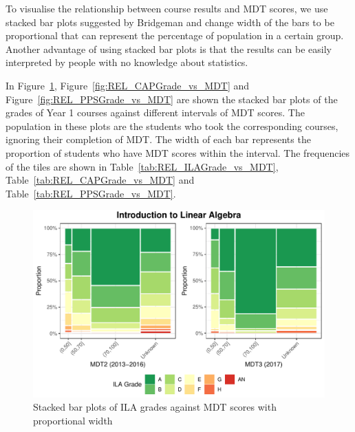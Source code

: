 \documentclass[a4paper]{report}
\begin{document}
To visualise the relationship between course results and MDT scores, we use stacked bar plots suggested by Bridgeman \cite{stackbar} and change width of the bars to be proportional that can represent the percentage of population in a certain group. Another advantage of using stacked bar plots is that the results can be easily interpreted by people with no knowledge about statistics. 

In Figure~\ref{fig:REL_ILAGrade_vs_MDT}, Figure~\ref{fig:REL_CAPGrade_vs_MDT} and Figure~\ref{fig:REL_PPSGrade_vs_MDT} are shown the stacked bar plots of the grades of Year 1 courses against different intervals of MDT scores. The population in these plots are the students who took the corresponding courses, ignoring their completion of MDT. The width of each bar represents the proportion of students who have MDT scores within the interval. The frequencies of the tiles are shown in Table~\ref{tab:REL_ILAGrade_vs_MDT}, Table~\ref{tab:REL_CAPGrade_vs_MDT} and Table~\ref{tab:REL_PPSGrade_vs_MDT}. 

\begin{figure}[H]
  \centering
  \includegraphics[width=\linewidth]{fig/REL_ILAGrade_vs_MDT.pdf}
  \caption{\label{fig:REL_ILAGrade_vs_MDT}Stacked bar plots of ILA grades against MDT scores with proportional width}
\end{figure}
\end{document}
